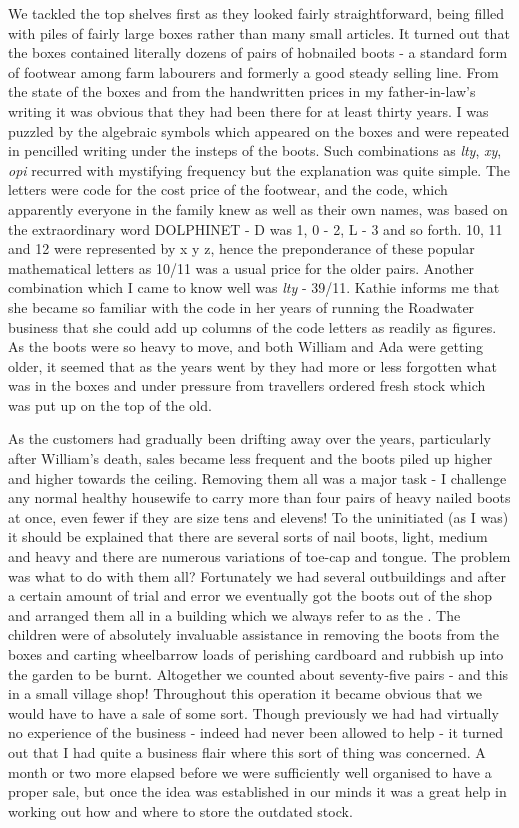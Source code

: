 We tackled the top shelves first as they looked fairly straightforward, being filled with piles of fairly large boxes rather than many small articles. It turned out that the boxes contained literally dozens of pairs of hobnailed boots - a standard form of footwear among farm labourers and formerly a good steady selling line. From the state of the boxes and from the handwritten prices in my father-in-law's writing it was obvious that they had been there for at least thirty years. I was puzzled by the algebraic symbols which appeared on the boxes and were repeated in pencilled writing under the insteps of the boots. Such combinations as \textit{lty}, \textit{xy}, \textit{opi} recurred with mystifying frequency but the explanation was quite simple. The letters were code for the cost price of the footwear, and the code, which apparently everyone in the family knew as well as their own names, was based on the extraordinary word DOLPHINET - D was 1, 0 - 2, L - 3 and so forth. 10, 11 and 12 were represented by x y z, hence the preponderance of these popular mathematical letters as 10/11 was a usual price for the older pairs. Another combination which I came to know well was \textit{lty} - 39/11. Kathie informs me that she became so familiar with the code in her years of running the Roadwater business that she could add up columns of the code letters as readily as figures. As the boots were so heavy to move, and both William and Ada were getting older, it seemed that as the years went by they had more or less forgotten what was in the boxes and under pressure from travellers ordered fresh stock which was put up on the top of the old.

As the customers had gradually been drifting away over the years, particularly after William's death, sales became less frequent and the boots piled up higher and higher towards the ceiling. Removing them all was a major task - I challenge any normal healthy housewife to carry more than four pairs of heavy nailed boots at once, even fewer if they are size tens and elevens! To the uninitiated (as I was) it should be explained that there are several sorts of	nail boots, light, medium and heavy and there are numerous variations of toe-cap and tongue. The problem was what to do with them all? Fortunately we had several outbuildings and after a certain amount of trial and error we eventually got the boots out of the shop and arranged them all in a building which we always refer to as the . The children were of absolutely invaluable assistance in removing the boots from the boxes and carting wheelbarrow loads of perishing cardboard and rubbish up into the garden to be burnt. Altogether we counted about seventy-five pairs - and this in a small village shop! Throughout this operation it became obvious that we would have to have a sale of some sort. Though previously	we had had virtually no experience of the business - indeed had never been allowed to help - it turned out that I had quite a business flair where this sort of thing was concerned. A month or two more elapsed before we were sufficiently well organised to have a proper sale, but once the idea was established in our minds it was a great help in working out how and where to store the outdated stock.

